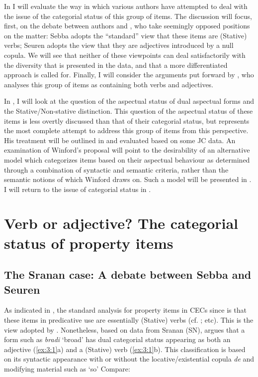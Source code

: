 In  I will evaluate the way in which various authors
have attempted to deal with the issue of the categorial status of this
group of items.  The discussion will focus, first, on the debate
between authors \citet{Sebba1986} and \citet{Seuren1986}, who take
seemingly opposed positions on the matter: Sebba adopts the “standard”
view that these items are (Stative) verbs; Seuren adopts
the view that they are adjectives introduced by a null copula. We will
see that neither of these viewpoints can deal satisfactorily with the
diversity that is presented in the data, and that a more
differentiated approach is called for.  Finally, I will consider the
arguments put forward by \citet{Kouwenberg1996}, who analyses this
group of items as containing both verbs and adjectives.

In , I will look at the question of the aspectual
status of dual aspectual forms and the Stative\slash Non-stative
distinction.  This question of the aspectual status of these items is
less overtly discussed than that of their categorial status, but
\citet{Winford1993} represents the most complete attempt to address
this group of items from this perspective.  His treatment will be
outlined in  and evaluated based on some JC data.  An
examination of Winford’s proposal will point to the desirability of an
alternative model which categorizes items based on their aspectual
behaviour as determined through a combination of syntactic and
semantic criteria, rather than the semantic notions of
\citet{Dixon1977} which Winford draws on.  Such a model will be
presented in .  I will return to the issue of categorial
status in .

\section{Verb or adjective? The categorial status of property
  items}\label{sec:3.1}


\subsection{The Sranan case: A debate between Sebba and
  Seuren}\label{sec:3.1.1}

As indicated in , the standard analysis for property
items in CECs since \citet{Voorhoeve1957} is that these items in
predicative use are essentially (Stative) verbs
(cf. \citealt{Alleyne1980,Jaganauth1987}; etc).  This is the view
adopted by \citet{Sebba1986}.  Nonetheless, based on data from Sranan
(SN), \citet{Sebba1986} argues that a form such as \textit{bradi}
`broad' has dual categorial status appearing as both an adjective
(\ref{ex:3:1}a) and a (Stative) verb (\ref{ex:3:1}b).  This
classification is based on its syntactic appearance with or without
the locative\slash existential copula \textit{de} and modifying material
such as `so'  Compare:

